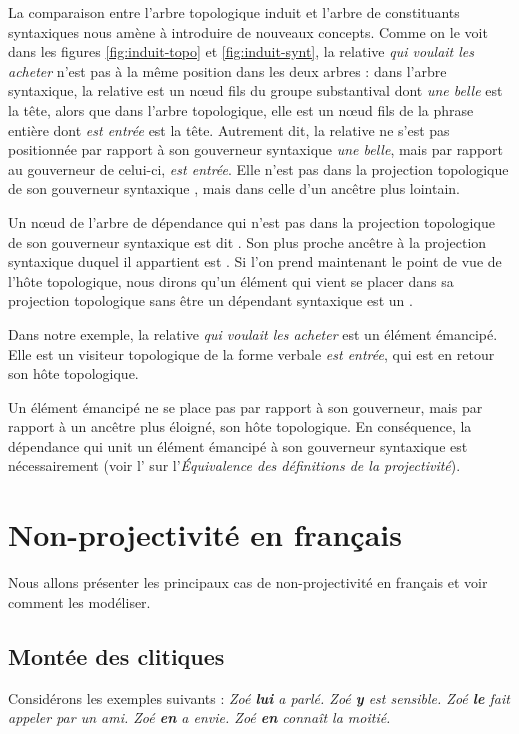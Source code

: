 La comparaison entre l’arbre topologique induit et l’arbre de constituants syntaxiques nous amène à introduire de nouveaux concepts. 
Comme on le voit dans les figures \ref{fig:induit-topo} et \ref{fig:induit-synt}, la relative \textit{qui voulait les acheter} n’est pas à la même position dans les deux arbres : dans l’arbre syntaxique, la relative est un nœud fils du groupe substantival dont \textit{une belle} est la tête, alors que dans l’arbre topologique, elle est un nœud fils de la phrase entière dont \textit{est entrée} est la tête. Autrement dit, la relative ne s’est pas positionnée par rapport à son gouverneur syntaxique \textit{une belle}, mais par rapport au gouverneur de celui-ci, \textit{est entrée}. Elle n'est pas dans la projection topologique de son gouverneur syntaxique , mais dans celle d'un ancêtre plus lointain.

{Un nœud de l'arbre de dépendance qui n'est pas dans la projection topologique de son gouverneur syntaxique est dit . Son plus proche ancêtre à la projection syntaxique duquel il appartient est . Si l’on prend maintenant le point de vue de l’hôte topologique, nous dirons qu’un élément qui vient se placer dans sa projection topologique sans être un dépendant syntaxique est un .}

Dans notre exemple, la relative \textit{qui voulait les acheter} est un élément émancipé. Elle est un visiteur topologique de la forme verbale \textit{est entrée}, qui est en retour son hôte topologique.

Un élément émancipé ne se place pas par rapport à son gouverneur, mais par rapport à un ancêtre plus éloigné, son hôte topologique. 
En conséquence, la dépendance qui unit un élément émancipé à son gouverneur syntaxique est nécessairement  (voir l’ sur l’\textit{Équivalence des définitions de la projectivité}).


\section{Non-projectivité en français}\label{sec:3.5.32}

Nous allons présenter les principaux cas de non-projectivité en français et voir comment les modéliser.

\subsection{Montée des clitiques}
Considérons les exemples suivants :
\ea
\ea \itshape Zoé \textbf{lui} a parlé.
\ex \itshape Zoé \textbf{y}   est sensible.
\ex \itshape Zoé \textbf{le}  fait appeler par un ami.
\ex \itshape Zoé \textbf{en}  a envie.
\ex \itshape Zoé \textbf{en}  connaît la moitié.
\z
\z

